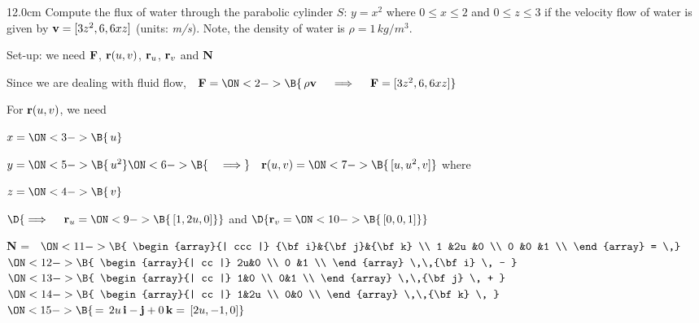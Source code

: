 \begin{frame}
\begin{columns}\begin{column}{12.0cm}
\scriptsize
\EX Compute the flux of water through the parabolic cylinder $S:\, y=x^2$ where $0 \le x \le 2$ and $0 \le z \le 3$ if the velocity flow of water is given by ${\bf v} = [3z^2, 6, 6xz]$ (units: {\em m/s}).  Note, the density of water is $\rho = 1 \, kg/m^3$.

\vspace{0.3cm}

Set-up: we need ${\bf F}$, ${\bf r}(u,v)$, ${\bf r}_u$, ${\bf r}_v$ and ${\bf N}$

\vspace{0.4cm}

Since we are dealing with fluid flow, \,\, ${\bf F} = 
\ON<2->{\B{\, \rho{\bf v} \quad \implies \quad {\bf F} = [3z^2, 6, 6xz]}}$

\vspace{0.3cm}

For ${\bf r}(u,v)$, we need

\vspace{0.2cm}

\quad $
x =
\ON<3->{\B{\,u}}$

\quad $
y =
\ON<5->{\B{\,u^2}}
\ON<6->{\B{\quad \implies}} \quad {\bf r}(u,v) =
\ON<7->{\B{\, [u,u^2,v]}}$ \qquad where 

\quad $
z =
\ON<4->{\B{\,v}}$

\vspace{0.2cm}
\hspace{1.3cm} $\D{
\implies \quad {\bf r}_u =
\ON<9->{\B{\, [1,2u,0]}}}$ \qquad 
and
\qquad $\D{
{\bf r}_v = 
\ON<10->{\B{\,[0,0,1]}}}$

\vspace{0.3cm}

{\bf N} = \,
$\ON<11->{\B{
\begin{array}{| ccc |}
	{\bf i}&{\bf j}&{\bf k} \\
	1      &2u     &0 \\
 	0      &0      &1 \\
\end{array}
= \,}}$
$\ON<12->{\B{
\begin{array}{| cc |}
		  2u&0 \\
 		  0 &1 \\
\end{array}
 \,\,{\bf i} \, - }}$\,\,
$\ON<13->{\B{
\begin{array}{| cc |}
		  1&0 \\
 		  0&1 \\
\end{array}
 \,\,{\bf j} \, + }}$\,\,
$\ON<14->{\B{
\begin{array}{| cc |}
		  1&2u \\
 		  0&0 \\
\end{array}
\,\,{\bf k} \, }}$
$
\ON<15->{\B{\, = \, 2u \,{\bf i} - {\bf j} + 0\,{\bf k} = \, [2u,-1,0]}}$


\end{column}
\end{columns}
\end{frame}
